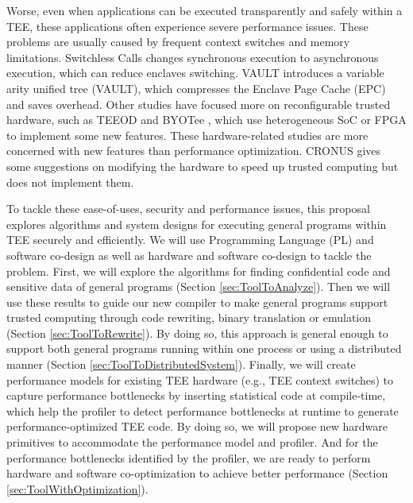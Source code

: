 Worse, even when applications can be executed transparently and safely within a TEE,
these applications often experience severe performance issues.
These problems are usually caused by frequent context switches and memory limitations.
Switchless Calls \cite{Tian2018SwitchlessCM} changes synchronous execution
to asynchronous execution, which can reduce enclaves switching.
VAULT \cite{Taassori2018VAULTRP} introduces a variable arity unified tree (VAULT),
which compresses the Enclave Page Cache (EPC) and saves overhead.
Other studies have focused more on reconfigurable trusted hardware,
such as TEEOD \cite{Pereira2021TowardsAT} and BYOTee \cite{Armanuzzaman2022BYOTeeTB},
which use heterogeneous SoC or FPGA to implement some new features.
These hardware-related studies are more concerned with new features than
performance optimization. CRONUS \cite{Jiang2022CRONUSFS} gives some suggestions
on modifying the hardware to speed up trusted computing but does not
implement them.

To tackle these ease-of-uses, security and performance issues, this proposal explores
algorithms and system designs for executing general programs within TEE securely and efficiently.
We will use Programming Language (PL) and software co-design as well as hardware and software co-design
to tackle the problem.
First, we will explore the algorithms for finding confidential code and sensitive data of
general programs (Section \ref{sec:ToolToAnalyze}). Then we will use these results
to guide our new compiler to make general programs support trusted computing through
code rewriting, binary translation or emulation (Section \ref{sec:ToolToRewrite}).
By doing so, this approach is general enough to support both general programs running within
one process or using a distributed manner (Section \ref{sec:ToolToDistributedSystem}).
Finally, we will create performance models for existing TEE hardware (e.g., TEE context switches)
to capture performance bottlenecks by inserting statistical code at compile-time,
which help the profiler to detect performance bottlenecks at runtime to generate
performance-optimized TEE code. By doing so, we will propose new hardware primitives
to accommodate the performance model and profiler.
And for the performance bottlenecks identified by the profiler, we are ready to
perform hardware and software co-optimization to achieve better performance
(Section \ref{sec:ToolWithOptimization}).
